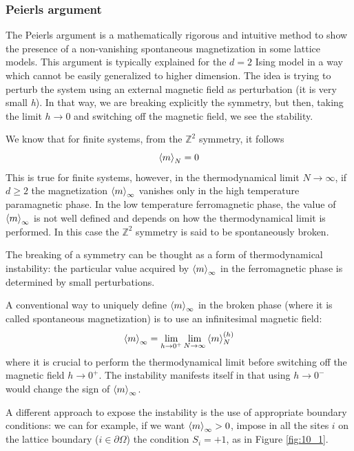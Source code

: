 \documentclass[../main/main.tex]{subfiles}
\begin{document}
\subsubsection{Peierls argument}
The Peierls argument \cite{10_lesson_1} is a mathematically rigorous and intuitive method to show the presence of a non-vanishing spontaneous magnetization in some lattice models. This argument is typically explained for the \(d=2\) Ising model in a way which cannot be easily generalized to higher dimension.
The idea is trying to perturb the system using an external magnetic field as perturbation (it is very small \emph{h}). In that way, we are breaking explicitly the symmetry, but then, taking the limit \( h \rightarrow 0 \) and switching off the magnetic field, we see the stability.

 We know that for finite systems, from the \( \mathbb{Z}^2 \) symmetry, it follows
\begin{equation*}
  \expval{m}_N = 0
\end{equation*}
This is true for finite systems, however, in the thermodynamical limit \( N \rightarrow \infty  \), if \(d \ge 2\) the magnetization \( \expval{m}_{\infty } \) vanishes only in the high temperature paramagnetic phase. 
In the low temperature ferromagnetic phase, the value of \( \expval{m}_{\infty } \) is not well defined and depends on how the thermodynamical limit is performed. In this case the \( \mathbb{Z}^2\) symmetry  is said to be spontaneously broken.

The breaking of a symmetry can be thought as a form of thermodynamical instability: the particular value acquired by \( \expval{m}_{\infty } \) in the ferromagnetic phase is determined by small perturbations.

A conventional way to uniquely define \( \expval{m}_{\infty } \) in the broken phase (where it is called spontaneous magnetization) is to use an infinitesimal magnetic field:
\begin{equation}
  \expval{m}_{\infty } = \lim_{h \rightarrow 0^+} \lim_{N \rightarrow \infty } \expval{m}_N^{(h)}
\end{equation}
where it is crucial to perform the thermodynamical limit before switching off the magnetic field \( h \rightarrow 0^+ \). The instability manifests itself in that using \( h \rightarrow 0^- \)  would change the sign of \( \expval{m}_{\infty } \).

A different approach to expose the instability is the use of appropriate boundary conditions:
we can for example, if we want \( \expval{m}_ \infty  > 0\), impose in all the sites \(i\) on the lattice boundary (\( i \in \partial{\Omega }  \)) the condition
\( S_i = +1 \),  as in Figure \ref{fig:10_1}.
\end{document}
